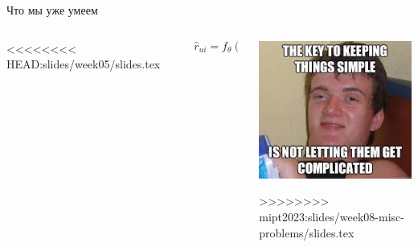 \documentclass[11pt,aspectratio=169,handout]{beamer}
\begin{document}
\begin{frame}{Что мы уже умеем}

\begin{columns}
<<<<<<<< HEAD:slides/week05/slides.tex

\begin{column}{0.2\textwidth}

\end{column}

\begin{column}{0.5\textwidth} 

\begin{tcolorbox}[colback=info!5,colframe=info!80,title=]
\begin{Large}
\[
\hat r_{ui} = f_{\theta}(x_u, x_i, x_c)
\]
\end{Large}
\end{tcolorbox}

\end{column}


\begin{column}{0.35\textwidth} 
\begin{center}
\includegraphics[scale=0.4]{images/simple.jpeg}
\end{center}
>>>>>>>> mipt2023:slides/week08-misc-problems/slides.tex
\end{column}
\end{columns}


\end{frame}
\end{document}
